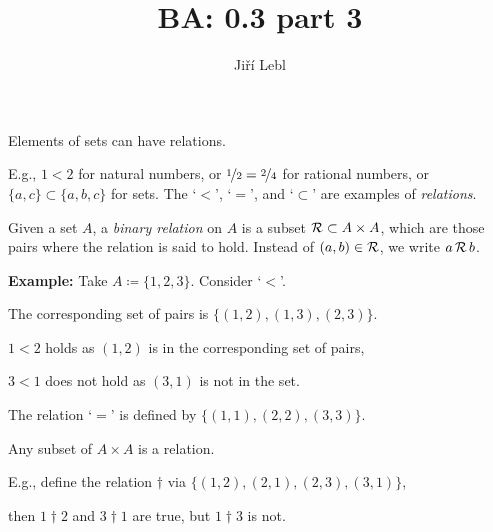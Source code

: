 \documentclass[10pt,aspectratio=169]{beamer}
\author{Ji\v{r}\'i Lebl}
\institute[OSU]{%
Departemento pri Matematiko de Oklahoma {\^S}tata Universitato}
\title{BA: 0.3 part 3}
\date{}
\begin{document}
\begin{frame}
\titlepage
\end{frame}

\begin{frame}
Elements of sets can have relations.

E.g., $1 < 2$
for natural numbers, or $\nicefrac{1}{2} = \nicefrac{2}{4}$ for rational
numbers, or $\{ a,c \} \subset \{ a,b,c \}$ for sets.  The `$<$', `$=$', and
`$\subset$' are examples of \emph{relations}.

\pause

\begin{definition}
Given a set $A$, a \emph{binary relation} on $A$
is a subset ${\mathcal{R}} \subset A \times A$,
which are those pairs where the relation is said to hold.
Instead of $(a,b) \in {\mathcal{R}}$, we write
$a \, {\mathcal{R}} \, b$.
\end{definition}

\pause
\textbf{Example:}
Take $A \coloneqq \{ 1,2,3 \}$.
Consider `$<$'.

\pause
\medskip

The corresponding set 
of pairs is $\bigl\{ (1,2), (1,3), (2,3) \bigr\}$.

\pause
\medskip

$1 < 2$ holds as $(1,2)$ is in the corresponding set of pairs,
\pause

$3 < 1$ does not hold as $(3,1)$ is not in the set.

\medskip
\pause

The relation `$=$'
is defined by $\bigl\{ (1,1), (2,2), (3,3) \big\}$.

\medskip
\pause

Any subset of $A \times A$ is a relation.
\pause

E.g., define the relation
$\dagger$ via $\bigl\{ (1,2), (2,1), (2,3), (3,1) \bigr\}$,

\pause
then $1 \dagger 2$ and
$3 \dagger 1$ are
true, but $1 \dagger 3$ is not.
\end{frame}
\end{document}
